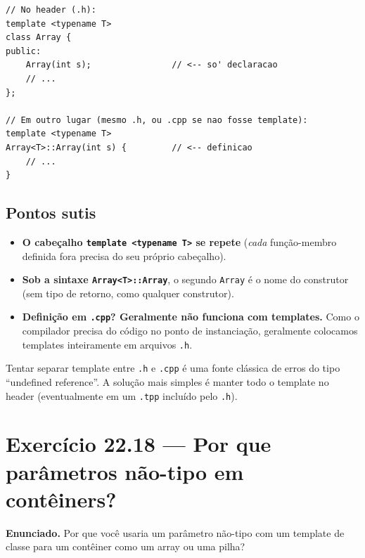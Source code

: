 \documentclass[11pt,a4paper]{article}
\begin{document}
\begin{lstlisting}[style=cppcode,numbers=none]
// No header (.h):
template <typename T>
class Array {
public:
    Array(int s);                // <-- so' declaracao
    // ...
};

// Em outro lugar (mesmo .h, ou .cpp se nao fosse template):
template <typename T>
Array<T>::Array(int s) {         // <-- definicao
    // ...
}
\end{lstlisting}

\subsection*{Pontos sutis}

\begin{itemize}[leftmargin=*,itemsep=0pt]
  \item \textbf{O cabe\c{c}alho \texttt{template <typename T>} se repete} (\emph{cada} fun\c{c}\~ao-membro definida fora precisa do seu pr\'oprio cabe\c{c}alho).
  \item \textbf{Sob a sintaxe \texttt{Array<T>::Array}}, o segundo \texttt{Array} \'e o nome do construtor (sem tipo de retorno, como qualquer construtor).
  \item \textbf{Defini\c{c}\~ao em \texttt{.cpp}? Geralmente n\~ao funciona com templates.} Como o compilador precisa do c\'odigo no ponto de instancia\c{c}\~ao, geralmente colocamos templates inteiramente em arquivos \texttt{.h}.
\end{itemize}

\begin{errocomum}
Tentar separar template entre \texttt{.h} e \texttt{.cpp} \'e uma fonte cl\'assica de erros do tipo ``undefined reference''. A solu\c{c}\~ao mais simples \'e manter todo o template no header (eventualmente em um \texttt{.tpp} inclu\'ido pelo \texttt{.h}).
\end{errocomum}

\section{Exerc\'icio 22.18 --- Por que par\^ametros n\~ao-tipo em cont\^einers?}

\begin{enunciado}
\textbf{Enunciado.} Por que voc\^e usaria um par\^ametro n\~ao-tipo com um template de classe para um cont\^einer como um array ou uma pilha?
\end{enunciado}
\end{document}
